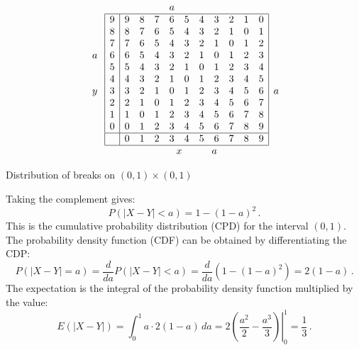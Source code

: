 \begin{table}[bt]
\[
\begin{array}{c}
\quad\\\\\\
a\\\\
\quad\\
y\\
\quad\\\quad\\\quad\\\quad
\end{array}
\begin{array}{|c|cccccccccc|}
\multicolumn{11}{l}{\qquad \qquad \qquad a}\\
\hline
9& 9 & 8 & 7 & 6 & 5 & 4 & 3 & 2 & 1 & 0  \\
8& 8 & 7 & 6 & 5 & 4 & 3 & 2 & 1 & 0 & 1  \\
7& 7 & 6 & 5 & 4 & 3 & 2 & 1 & 0 & 1 & 2  \\
6& 6 & 5 & 4 & 3 & 2 & 1 & 0 & 1 & 2 & 3  \\
5& 5 & 4 & 3 & 2 & 1 & 0 & 1 & 2 & 3 & 4  \\
4& 4 & 3 & 2 & 1 & 0 & 1 & 2 & 3 & 4 & 5  \\
3& 3 & 2 & 1 & 0 & 1 & 2 & 3 & 4 & 5 & 6  \\
2& 2 & 1 & 0 & 1 & 2 & 3 & 4 & 5 & 6 & 7  \\
1& 1 & 0 & 1 & 2 & 3 & 4 & 5 & 6 & 7 & 8  \\
0& 0 & 1 & 2 & 3 & 4 & 5 & 6 & 7 & 8 & 9  \\
\hline
&0 & 1 & 2 & 3 & 4 & 5 & 6 & 7 & 8 & 9  \\
\hline
\multicolumn{11}{c}{\quad \quad x\quad\quad\quad a}
\end{array}
\begin{array}{c}
\\\\\\
a\\\\
\end{array}
\]
\caption{Distribution of breaks on $(0,1)\times (0,1)$}\label{t.rods}
\end{table}

Taking the complement gives:
\[
P(|X-Y|<a)=1-(1-a)^2\,.
\]
This is the cumulative probability distribution (CPD) for the interval $(0,1)$. The probability density function (CDF) can be obtained by differentiating the CDP:
\[
P(|X-Y|=a)= \frac{d}{da}P(|X-Y|<a) =
  \frac{d}{da}(1-(1-a)^2)=2(1-a)\,.
\]
The expectation is the integral of the probability density function multiplied by the value:
\[
E(|X-Y|)= \int_{0}^{1} a\cdot2(1-a)\, da=
  2\left.\left(\frac{a^2}{2}-\frac{a^3}{3}\right)\right|_0^1=\frac{1}{3}\,.
\]

